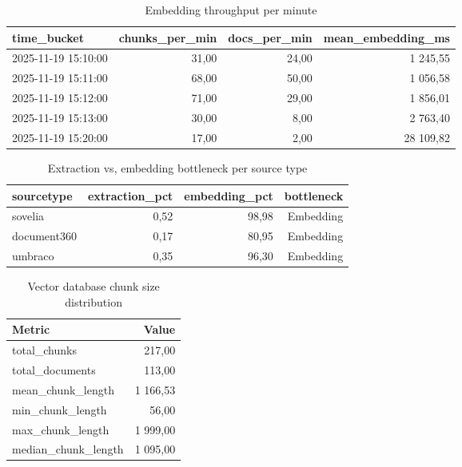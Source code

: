 \begin{table}[htbp]
    \centering
    \small
    \begin{tabular}{lrrr}
        \toprule
        time\_bucket        & chunks\_per\_min & docs\_per\_min & mean\_embedding\_ms \\
        \midrule
        2025-11-19 15:10:00 & 31,00            & 24,00          & 1 245,55            \\
        2025-11-19 15:11:00 & 68,00            & 50,00          & 1 056,58            \\
        2025-11-19 15:12:00 & 71,00            & 29,00          & 1 856,01            \\
        2025-11-19 15:13:00 & 30,00            & 8,00           & 2 763,40            \\
        2025-11-19 15:20:00 & 17,00            & 2,00           & 28 109,82           \\
        \bottomrule
    \end{tabular}
    \caption{Embedding throughput per minute}
    \label{tab:embedding-throughput}
\end{table}

\begin{table}[htbp]
    \centering
    \small
    \begin{tabular}{lrrr}
        \toprule
        sourcetype  & extraction\_pct & embedding\_pct & bottleneck \\
        \midrule
        sovelia     & 0,52            & 98,98          & Embedding  \\
        document360 & 0,17            & 80,95          & Embedding  \\
        umbraco     & 0,35            & 96,30          & Embedding  \\
        \bottomrule
    \end{tabular}
    \caption{Extraction vs, embedding bottleneck per source type}
    \label{tab:extraction-embedding-bottleneck}
\end{table}

\begin{table}[htbp]
    \centering
    \small
    \begin{tabular}{lr}
        \toprule
        Metric                & Value    \\
        \midrule
        total\_chunks         & 217,00   \\
        total\_documents      & 113,00   \\
        mean\_chunk\_length   & 1 166,53 \\
        min\_chunk\_length    & 56,00    \\
        max\_chunk\_length    & 1 999,00 \\
        median\_chunk\_length & 1 095,00 \\
        \bottomrule
    \end{tabular}
    \caption{Vector database chunk size distribution}
    \label{tab:chunk-size-distribution}
\end{table}

